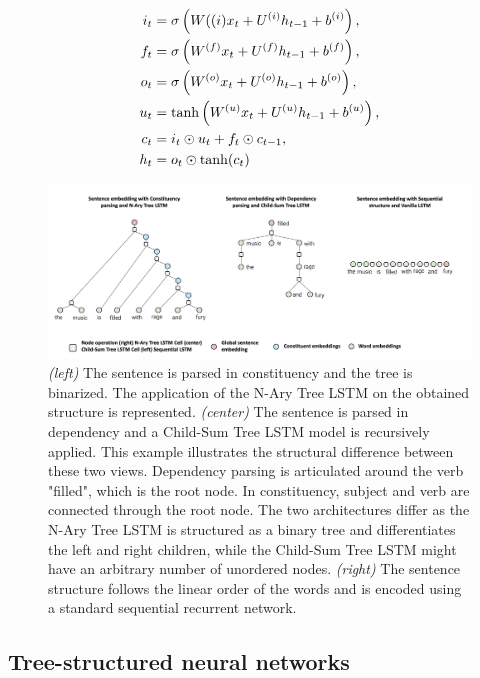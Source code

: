 \begin{align}
i_t &=\sigma \left( W({(i)} x_t + U^{(i)} h_{t-1} + b^{(i)} \right), \labeq{lstm-def-first}\\
f_{t} &= \sigma\left( W^{(f)} x_t + U^{(f)} h_{t-1} + b^{(f)} \right), \labeq{lstm-def-f}\\
o_t &=\sigma \left( W^{(o)} x_t + U^{(o)} h_{t-1} + b^{(o)} \right), \\
u_t &= \tanh \left( W^{(u)} x_t + U^{(u)} h_{t-1} + b^{(u)} \right), \\
c_t &= i_t \odot u_t + f_{t} \odot c_{t-1}, \\
h_t &= o_t \odot \tanh(c_t) \labeq{lstm-def-last}
\end{align}


\begin{figure}[!htb]
\begin{center}
\includegraphics[width=16cm]{images/multi-views-2.png}
\end{center}
\caption{\textit{(left)} The sentence is parsed in constituency and the tree is binarized. The application of the N-Ary Tree LSTM on the obtained structure is represented. \textit{(center)} The sentence is parsed in dependency and a Child-Sum Tree LSTM model is recursively applied. This example illustrates the structural difference between these two views. Dependency parsing is articulated around the verb "filled", which is the root node. In constituency, subject and verb are connected through the root node. The two architectures differ as the N-Ary Tree LSTM is structured as a binary tree and differentiates the left and right children, while the Child-Sum Tree LSTM might have an arbitrary number of unordered nodes. \textit{(right)} The sentence structure follows the linear order of the words and is encoded using a standard sequential recurrent network.}
\end{figure}

\subsection{Tree-structured neural networks}

